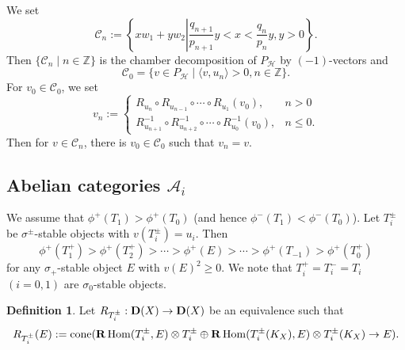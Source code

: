 \documentclass[leqno,11pt]{amsart}
\def\Z{\ensuremath{\mathbb{Z}}}
\def\Hom{\mathop{\mathrm{Hom}}\nolimits}
\theoremstyle{definition}
\newtheorem{Def}[Thm]{Definition}
\def\Z{\ensuremath{\mathbb{Z}}}
\def\AA{\ensuremath{\mathcal A}}
\def\CC{\ensuremath{\mathcal C}}
\def\HH{\ensuremath{\mathcal H}}
\begin{document}
%
%
We set
\begin{equation}
\CC_n:=\left\{x w_1+y w_2 \left|
 \frac{q_{n+1}}{p_{n+1}}y<x<\frac{q_n}{p_n}y, y>0 \right. \right\}.
\end{equation}
Then $\{\CC_n \mid n \in \Z \}$ is the chamber decomposition
of $P_{\HH}$ by $(-1)$-vectors and 
$$
\CC_0=\{ v \in P_{\HH} \mid \langle v, u_n \rangle>0, n \in \Z \}.
$$
For $v_0 \in \CC_0$, 
we set 
\begin{equation}
v_n:= 
\begin{cases}
R_{u_n} \circ R_{u_{n-1}} \circ \cdots \circ R_{u_1}(v_0), & n>0\\
R_{u_{n+1}}^{-1} \circ R_{u_{n+2}}^{-1} 
\circ \cdots \circ R_{u_0}^{-1}(v_0), & n \leq 0.
\end{cases}
\end{equation}
Then for $v \in \CC_n$, there is $v_0 \in \CC_0$ such that
$v_n=v$.


\subsection{Abelian categories $\AA_i$}


We assume that $\phi^+(T_1)>\phi^+(T_0)$ (and hence $\phi^-(T_1)<\phi^-(T_0)$).
Let $T_i^\pm$ be $\sigma^\pm$-stable objects with
$v(T_i^\pm)=u_i$.
Then 
\begin{equation}
\phi^+(T_1^+) > \phi^+(T_2^+)>\cdots>\phi^+(E)>
\cdots >\phi^+(T_{-1})>\phi^+(T_0^+)
\end{equation}
for any $\sigma_+$-stable object $E$ with
$v(E)^2 \geq 0$.
We note that $T_i^+=T_i^-=T_i$ $(i=0,1)$ are $\sigma_0$-stable objects.


\begin{Def}
Let $R_{T_i^\pm}:{\bf D}(X) \to {\bf D}(X)$ be an equivalence such that
\begin{equation}
R_{T_i^\pm}(E):=\mathrm{cone}({\bf R}\Hom(T_i^\pm,E)\otimes T_i^\pm  \oplus 
{\bf R}\Hom(T_i^\pm (K_X),E) \otimes T_i^\pm (K_X) \to E).
\end{equation}
\end{Def}
\end{document}

